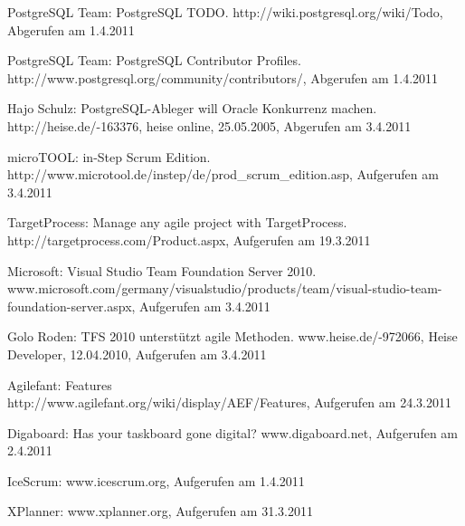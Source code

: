 \documentclass[german,english]{header}
\begin{document}
\begin{thebibliography}{5}
PostgreSQL Team:
PostgreSQL TODO.
http://wiki.postgresql.org/wiki/Todo, Abgerufen am 1.4.2011

PostgreSQL Team:
PostgreSQL Contributor Profiles.\\
http://www.postgresql.org/community/contributors/, Abgerufen am 1.4.2011

Hajo Schulz:
PostgreSQL-Ableger will Oracle Konkurrenz machen.\\
http://heise.de/-163376, heise online, 25.05.2005, Abgerufen am 3.4.2011

microTOOL:
in-Step Scrum Edition.\\
http://www.microtool.de/instep/de/prod\_scrum\_edition.asp,
Aufgerufen am 3.4.2011

TargetProcess: Manage any agile project with TargetProcess.\\
http://targetprocess.com/Product.aspx,
Aufgerufen am 19.3.2011

Microsoft:
Visual Studio Team Foundation Server 2010.
www.microsoft.com/germany/visualstudio/products/team/visual-studio-team-foundation-server.aspx,
Aufgerufen am 3.4.2011

Golo Roden: 
TFS 2010 unterstützt agile Methoden.
www.heise.de/-972066,
Heise Developer, 12.04.2010, Aufgerufen am 3.4.2011

Agilefant: Features\\ 
http://www.agilefant.org/wiki/display/AEF/Features,
Aufgerufen am 24.3.2011

Digaboard: Has your taskboard gone digital?
www.digaboard.net,
Aufgerufen am 2.4.2011

IceScrum:
www.icescrum.org,
Aufgerufen am 1.4.2011

XPlanner:
www.xplanner.org,
Aufgerufen am 31.3.2011

\end{thebibliography}
\end{document}
